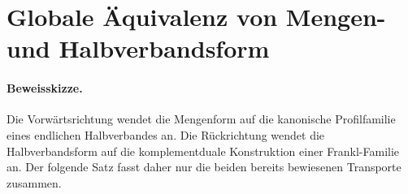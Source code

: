 \documentclass[main.tex]{subfiles}
\begin{document}
\section{Globale Äquivalenz von Mengen- und Halbverbandsform}



\paragraph{Beweisskizze.}
Die Vorwärtsrichtung wendet die Mengenform auf die kanonische Profilfamilie
eines endlichen Halbverbandes an. Die Rückrichtung wendet die
Halbverbandsform auf die komplementduale Konstruktion einer Frankl-Familie
an. Der folgende Satz fasst daher nur die beiden bereits bewiesenen
Transporte zusammen.
\end{document}
